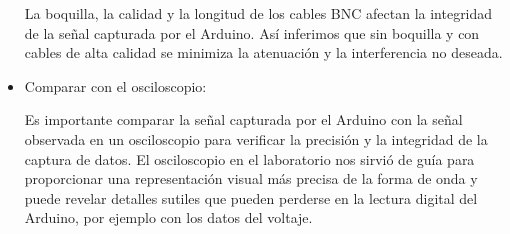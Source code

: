 \documentclass[
  letterpaper,
  DIV=11,
  numbers=noendperiod]{scrartcl}
\begin{document}
\begin{itemize}
  La boquilla, la calidad y la longitud de los cables BNC afectan la
  integridad de la señal capturada por el Arduino. Así inferimos que sin
  boquilla y con cables de alta calidad se minimiza la atenuación y la
  interferencia no deseada.
\item
  Comparar con el osciloscopio:

  Es importante comparar la señal capturada por el Arduino con la señal
  observada en un osciloscopio para verificar la precisión y la
  integridad de la captura de datos. El osciloscopio en el laboratorio
  nos sirvió de guía para proporcionar una representación visual más
  precisa de la forma de onda y puede revelar detalles sutiles que
  pueden perderse en la lectura digital del Arduino, por ejemplo con los
  datos del voltaje.
\end{itemize}
\end{document}
